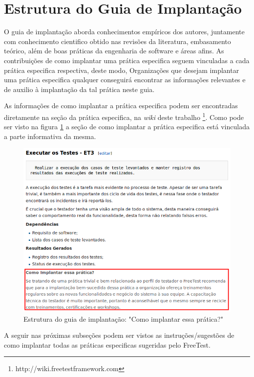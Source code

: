 \section{Estrutura do Guia de Implantação}
\label{sec:estruturaguiaimplantacao}

O guia de implantação aborda conhecimentos empíricos dos autores, juntamente com conhecimento cientifico obtido nas revisões da literatura, embasamento teórico, além de boas práticas da engenharia de software e áreas afins. As contribuições de como implantar uma prática especifica seguem vinculadas a cada prática especifica respectiva, deste modo, Organizações que desejam implantar uma prática especifica qualquer conseguirá encontrar as informações relevantes e de auxilio à implantação da tal prática neste guia.

As informações de como implantar a prática especifica podem ser encontradas diretamente na seção da prática especifica, na \textit{wiki} deste trabalho \footnote{http://wiki.freetestframework.com}. Como pode ser visto na figura \ref{fig:fig51} a seção de como implantar a prática especifica está vinculada a parte informativa da mesma.

\begin{figure}[H]
\centering
\includegraphics[width=.90\textwidth]{fig/figura51.png}
\caption{Estrutura do guia de implantação: "Como implantar essa prática?"}
\label{fig:fig51}
\end{figure}

A seguir nas próximas subseções podem ser vistos as instruções/sugestões de como implantar todas as práticas especificas sugeridas pelo FreeTest.

